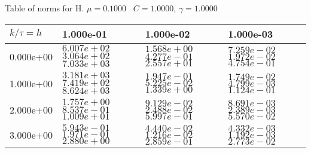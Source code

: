 \begin{center}
Table of norms for H. $\mu = 0.1000$ \, $C = 1.0000$, $\gamma = 1.0000$
  
\begin{tabular}{|p{1in}|p{1in}|p{1in}|p{1in}|} \hline
$k / \tau = h$ &1.000e-01 &1.000e-02 &1.000e-03 \\ \hline 
0.000e+00 & $6.007e+02$  $3.064e+02$  $7.033e+03$  & $1.568e+00$  $4.277e-01$  $2.557e+01$  & $7.259e-02$  $1.972e-02$  $4.754e-01$  \\ \hline 
1.000e+00 & $3.181e+03$  $7.419e+02$  $8.624e+03$  & $1.947e-01$  $5.225e-02$  $1.339e+00$  & $1.749e-02$  $4.799e-03$  $1.124e-01$  \\ \hline 
2.000e+00 & $1.757e+00$  $8.537e-01$  $1.009e+01$  & $9.129e-02$  $2.488e-02$  $5.997e-01$  & $8.691e-03$  $2.389e-03$  $5.570e-02$  \\ \hline 
3.000e+00 & $5.943e-01$  $1.971e-01$  $2.880e+00$  & $4.440e-02$  $1.216e-02$  $2.859e-01$  & $4.332e-03$  $1.192e-03$  $2.773e-02$  \\ \hline 

\end{tabular}\\[20pt]
\end{center}
